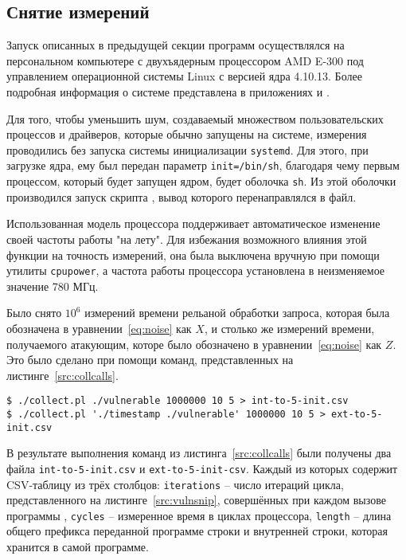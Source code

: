 \subsection{Снятие измерений}

Запуск описанных в предыдущей секции программ осуществлялся на персональном компьютере с двухъядерным
процессором AMD E-300 под управлением операционной системы Linux с версией ядра
4.10.13. Более подробная информация о системе представлена в приложениях
 и .

Для того, чтобы уменьшить шум, создаваемый множеством пользовательских процессов
и драйверов, которые обычно запущены на системе, измерения проводились без запуска
системы инициализации \texttt{systemd}. Для этого, при загрузке ядра, ему был
передан параметр \texttt{init=/bin/sh}, благодаря чему первым процессом, который
будет запущен ядром, будет оболочка \texttt{sh}. Из этой оболочки производился
запуск скрипта , вывод которого перенаправлялся в файл.

Использованная модель процессора поддерживает автоматическое изменение своей частоты
работы "на лету". Для избежания возможного влияния этой функции на точность измерений,
она была выключена вручную при помощи утилиты \texttt{cpupower},
а частота работы процессора установлена в неизменяемое значение 780 МГц.

Было снято $10^6$ измерений времени рельаной обработки запроса, которая была обозначена в
уравнении~\ref{eq:noise} как $X$, и столько же измерений времени, получаемого атакующим,
которе было обозначено в уравнении~\ref{eq:noise} как $Z$. Это было сделано при помощи
команд, представленных на листинге~\ref{src:collcalls}.

\begin{lstlisting}[caption=Команды снятия измерений, label=src:collcalls]
$ ./collect.pl ./vulnerable 1000000 10 5 > int-to-5-init.csv
$ ./collect.pl './timestamp ./vulnerable' 1000000 10 5 > ext-to-5-init.csv
\end{lstlisting}

В результате выполнения команд из листинга~\ref{src:collcalls} были получены два файла
\texttt{int-to-5-init.csv} и \texttt{ext-to-5-init-csv}. Каждый из которых содержит CSV-таблицу
из трёх столбцов: \texttt{iterations} -- число итераций цикла, представленного на
листинге~\ref{src:vulnsnip}, совершённых при каждом вызове программы
, \texttt{cycles} -- измеренное время в циклах процессора,
\texttt{length} -- длина общего префикса переданной программе  строки и
внутренней строки, которая хранится в самой программе.

